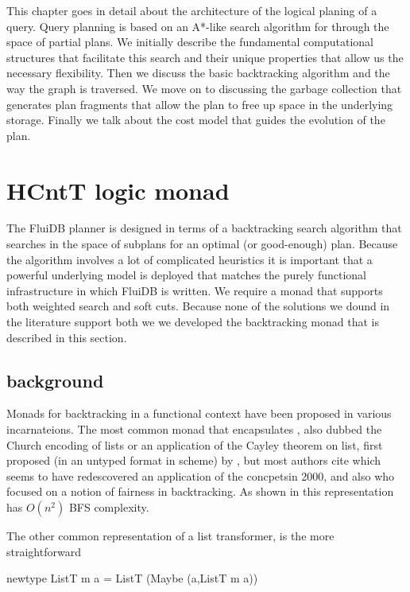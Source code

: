 This chapter goes in detail about the architecture of the logical
planing of a query. Query planning is based on an A*-like search
algorithm for through the space of partial plans. We initially
describe the fundamental computational structures that facilitate this
search and their unique properties that allow us the necessary
flexibility. Then we discuss the basic backtracking algorithm and the
way the graph is traversed. We move on to discussing the garbage
collection that generates plan fragments that allow the plan to free
up space in the underlying storage. Finally we talk about the cost
model that guides the evolution of the plan.
\section{HCntT logic monad}
\label{sec:org670bd3e}
The FluiDB planner is designed in terms of a backtracking search
algorithm that searches in the space of subplans for an optimal (or
good-enough) plan. Because the algorithm involves a lot of complicated
heuristics it is important that a powerful underlying model is
deployed that matches the purely functional infrastructure in which
FluiDB is written.  We require a monad that supports both weighted
search and soft cuts. Because none of the solutions we dound in the
literature support both we we developed the  backtracking monad
that is described in this section.

\subsection{background}
\label{sec:org5cbe9b8}
Monads for backtracking in a functional context have been proposed in
various incarnateions.  The most common monad that encapsulates , also dubbed the
Church encoding of lists or an application of the Cayley theorem on
list, first proposed (in an untyped format in scheme) by
\cite{haynesLogicContinuations1987}, but most authors cite
\cite{hinzeDerivingBacktrackingMonad2000a} which seems to have
redescovered an application of the concpetsin 2000, and also
\cite{kiselyovBacktrackingInterleavingTerminating} who focused on a
notion of fairness in backtracking. As shown in
\cite{kidneyAlgebrasWeightedSearch2021} this representation has
\(O(n^2)\) BFS complexity.

The other common representation of a list transformer, is the more
straightforward

\begin{haskellcode}
newtype ListT m a = ListT (Maybe (a,ListT m a))
\end{haskellcode}

